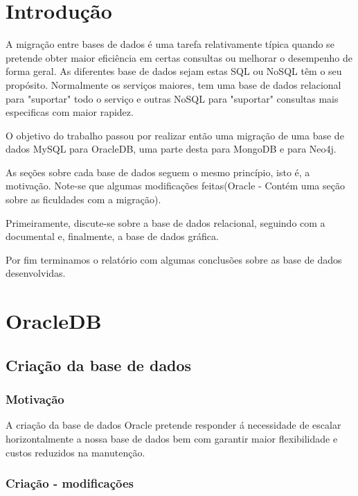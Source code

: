 \section{Introdução}

A migração entre bases de dados é uma tarefa relativamente típica quando se pretende obter maior eficiência em certas consultas ou melhorar o desempenho de forma geral. As diferentes base de dados sejam estas SQL ou NoSQL têm o seu propósito. Normalmente os serviços maiores, tem uma base de dados relacional para "suportar" todo o serviço e outras NoSQL para "suportar" consultas mais especificas com maior rapidez.

O objetivo do trabalho passou por realizar então uma migração de uma base de dados MySQL para OracleDB, uma parte desta para MongoDB e para Neo4j.

As seções sobre cada base de dados seguem o mesmo princípio, isto é, a motivação. Note-se que algumas modificações feitas(Oracle - Contém uma seção sobre as ficuldades com a migração).

Primeiramente, discute-se sobre a base de dados relacional, seguindo com a documental e, finalmente, a base de dados gráfica. 

Por fim terminamos o relatório com algumas conclusões sobre as base de dados desenvolvidas.


\section{OracleDB}

\subsection{Criação da base de dados}

\subsubsection{Motivação}\hfill
\newline
\par A criação da base de dados Oracle pretende responder á necessidade de escalar horizontalmente a nossa base de dados bem com garantir maior flexibilidade e custos reduzidos na manutenção.

\subsubsection{Criação - modificações}\hfill
\newline

